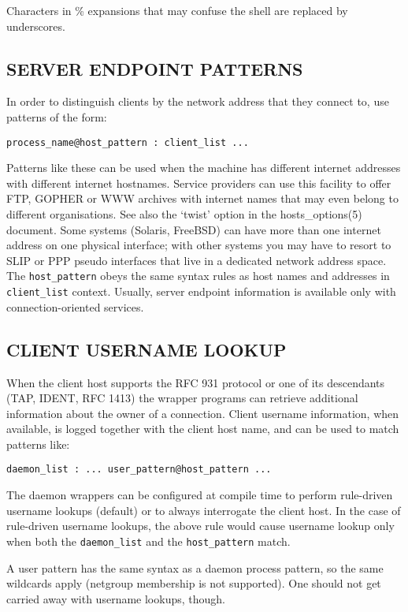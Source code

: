 \documentclass[11pt,twoside,a4paper]{book}
\begin{document}
Characters in \% expansions that may confuse the shell are replaced by
underscores.

\subsection*{SERVER ENDPOINT PATTERNS}

In order to distinguish clients by the network address that they
connect to, use patterns of the form:

\texttt{process\_name@host\_pattern : client\_list ... }

Patterns like these can be used when the machine has different
internet addresses with different internet hostnames.  Service
providers can use this facility to offer FTP, GOPHER or WWW archives
with internet names that may even belong to different
organisations. See also the `twist' option in the hosts\_options(5)
document. Some systems (Solaris, FreeBSD) can have more than one
internet address on one physical interface; with other systems you may
have to resort to SLIP or PPP pseudo interfaces that live in a
dedicated network address space. The \texttt{host\_pattern} obeys
the same syntax rules as host names and addresses in
\texttt{client\_list} context. Usually, server endpoint information is
available only with connection-oriented services.


\subsection*{CLIENT USERNAME LOOKUP}

When the client host supports the RFC 931 protocol or one of its
descendants (TAP, IDENT, RFC 1413) the wrapper programs can retrieve
additional information about the owner of a connection. Client
username information, when available, is logged together with the
client host name, and can be used to match patterns like:

\texttt{daemon\_list : ... user\_pattern@host\_pattern ...}

The daemon wrappers can be configured at compile time to perform
rule-driven username lookups (default) or to always interrogate the
client host.  In the case of rule-driven username lookups, the above
rule would cause username lookup only when both the
\texttt{daemon\_list} and the \texttt{host\_pattern} match.

A user pattern has the same syntax as a daemon process pattern, so the
same wildcards apply (netgroup membership is not supported).  One
should not get carried away with username lookups, though.
\end{document}
